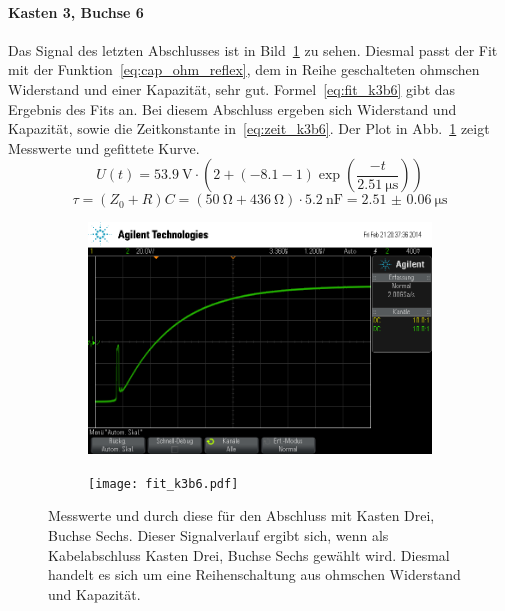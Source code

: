 \paragraph{Kasten 3, Buchse 6}
Das Signal des letzten Abschlusses ist in Bild~\ref{fig:k3b6} zu sehen.
Diesmal passt der Fit mit der Funktion~\eqref{eq:cap_ohm_reflex}, dem in
Reihe geschalteten ohmschen Widerstand und einer Kapazität, sehr gut.
Formel~\eqref{eq:fit_k3b6} gibt das Ergebnis des Fits an.  Bei diesem
Abschluss ergeben sich Widerstand und Kapazität, sowie die 
Zeitkonstante in~\eqref{eq:zeit_k3b6}. Der  Plot
in Abb.~\ref{fig:k3b6} zeigt Messwerte und gefittete Kurve.
%
\begin{equation}
  U(t) = \SI{53.9}{\volt}\cdot\left(2 + 
    \left(-8.1 - 1\right)\exp{\left(\frac{-t}
{\SI{2.51}{\micro\second}}\right)}\right)
  \label{eq:fit_k3b6}
\end{equation}
%
\begin{equation}
  \tau = (Z_0 + R)C = 
(\SI{50}{\ohm}+\SI{436}{\ohm})\cdot\SI{5.2}{\nano\farad}= 
\SI{2.51(6)}{\micro\second}
  \label{eq:zeit_k3b6}
\end{equation}
%
\begin{figure}[]
  \centering

  \begin{subfigure}{0.45\textwidth}
    \includegraphics[width=\textwidth]{k3b6.png}
  \end{subfigure}
  \quad
  \begin{subfigure}{0.45\textwidth}
    \texttt{[image: fit\_k3b6.pdf]}
  \end{subfigure}

  \caption{Messwerte und durch diese für den Abschluss mit Kasten Drei,
    Buchse Sechs.  Dieser Signalverlauf ergibt sich, wenn als
    Kabelabschluss Kasten Drei, Buchse Sechs gewählt wird. Diesmal
    handelt es sich um eine Reihenschaltung aus ohmschen Widerstand und
    Kapazität.}
  \label{fig:k3b6}
\end{figure}
